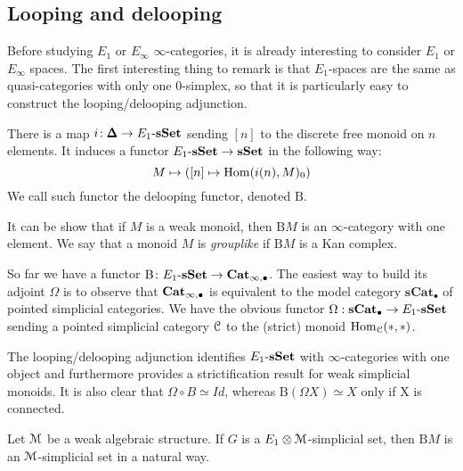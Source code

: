 \begin{refsection}
\section{Looping and delooping}

Before studying $E_1$ or $E_{\infty}$ $\infty$-categories, it is already interesting to consider $E_1$ or $E_{\infty}$ spaces. The first interesting thing to remark is that $E_1$-spaces are the same as quasi-categories with only one 0-simplex, so that it is particularly easy to construct the looping/delooping adjunction.

\begin{definition}
There is a map $i \colon \pmb{\Delta}\to E_1 \textrm{-} \mathbf{sSet}$ sending $[n]$ to the discrete free monoid on $n$ elements. It induces a functor $E_1 \textrm{-} \mathbf{sSet} \to \mathbf{sSet}$ in the following way:
\[
M \mapsto ([n] \mapsto \mathrm{Hom}(i(n),M)_0 )
\]
We call such functor the delooping functor, denoted $\mathrm{B}$.
\end{definition}

\begin{proposition}
It can be show that if $M$ is a weak monoid, then $\mathrm{B}M$ is an $\infty$-category with one element. We say that a monoid $M$ is \emph{grouplike} if $\mathrm{B}M$ is a Kan complex.
\end{proposition}

\begin{remark}
So far we have a functor $\mathrm{B} \colon E_1 \textrm{-} \mathbf{sSet} \to \mathbf{Cat}_{\infty,\bullet}$. The easiest way to build its adjoint $\Omega$ is to observe that $\mathbf{Cat}_{\infty, \bullet}$ is equivalent to the model category $\mathbf{sCat}_{\bullet}$ of pointed simplicial categories. We have the obvious functor $\Omega: \mathbf{sCat}_{\bullet} \to E_1\textrm{-} \mathbf{sSet}$ sending a
pointed simplicial category $\mathcal{C}$ to the (strict) monoid $\mathrm{Hom}_{\mathcal{C}}(*,*)$.
\end{remark}

The looping/delooping adjunction identifies $E_1 \textrm{-} \mathbf{sSet}$ with $\infty$-categories with one object and furthermore provides a strictification result for weak simplicial monoids. It is also clear that $\Omega \circ B \simeq Id$, whereas $\mathrm{B}(\Omega X) \simeq X$ only if X is connected.

\begin{proposition}
Let $\mathcal{M}$ be a weak algebraic structure. If $G$ is a $E_1 \otimes \mathcal{M}$-simplicial set, then $\mathrm{B} M$ is an $\mathcal{M}$-simplicial set in a natural way.
\end{proposition}


\end{refsection}
